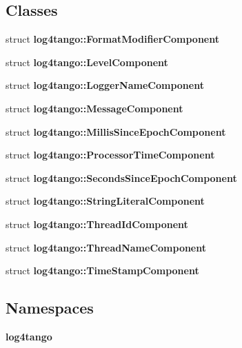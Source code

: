 \subsection*{Classes}
\begin{DoxyCompactItemize}
\item 
struct {\bf log4tango\-::\-Format\-Modifier\-Component}
\item 
struct {\bf log4tango\-::\-Level\-Component}
\item 
struct {\bf log4tango\-::\-Logger\-Name\-Component}
\item 
struct {\bf log4tango\-::\-Message\-Component}
\item 
struct {\bf log4tango\-::\-Millis\-Since\-Epoch\-Component}
\item 
struct {\bf log4tango\-::\-Processor\-Time\-Component}
\item 
struct {\bf log4tango\-::\-Seconds\-Since\-Epoch\-Component}
\item 
struct {\bf log4tango\-::\-String\-Literal\-Component}
\item 
struct {\bf log4tango\-::\-Thread\-Id\-Component}
\item 
struct {\bf log4tango\-::\-Thread\-Name\-Component}
\item 
struct {\bf log4tango\-::\-Time\-Stamp\-Component}
\end{DoxyCompactItemize}
\subsection*{Namespaces}
\begin{DoxyCompactItemize}
\item 
{\bf log4tango}
\end{DoxyCompactItemize}

